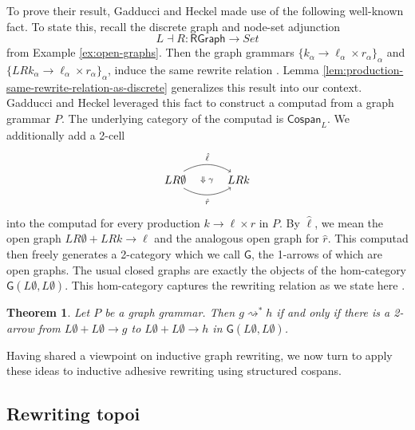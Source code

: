 \documentclass{amsart}
\newcommand{\RGraph}{\cat{RGraph}}
\newcommand{\Csp}{\cat{Cospan}}
\newcommand{\cat}[1]{\mathsf{#1}}
\newcommand{\from}{\colon}
\newcommand{\deriv}[2]{#1 \rightsquigarrow^\ast #2}
\newcommand{\csp}[3]{#1 + #3 \to #2}
\newtheorem{theorem}{Theorem}[section]
\theoremstyle{remark}
\theoremstyle{definition}
\begin{document}
To prove their result, Gadducci and Heckel made use of the following
well-known fact. To state this, recall the discrete graph and node-set
adjunction
%
\[
  L \dashv R \from \RGraph \to Set
\]
% 
from Example \ref{ex:open-graphs}. Then the graph grammars
%
$ \{ k_\alpha \to \ell_\alpha \times r_\alpha \}_\alpha $
%
and
%
$ \{ LR k_\alpha  \to \ell_\alpha \times
r_\alpha \}_\alpha $,
% 
induce the same rewrite relation
\cite[Prop.~3.3]{Ehrig_GraphGram}. Lemma
\ref{lem:production-same-rewrite-relation-as-discrete} generalizes
this result into our context.  Gadducci and Heckel leveraged this fact
to construct a computad from a graph grammar $ P $. The underlying
category of the computad is $ \Csp_L $. We additionally add a 2-cell
%
\[
  \begin{tikzpicture}
    \node (1) at (0,0) {$ LR \emptyset $};
    \node (2) at (2,0) {$ LR k $};
    \node (3) at (1,0) {\scriptsize{$ \Downarrow \gamma $}};
    \draw [->, bend left] (1.45) to node [above] {\scriptsize{$ \hat{\ell} $}} (2.135);
    \draw [->, bend right] (1.-45) to node [below] {\scriptsize{$ \hat{r} $}} (2.-135);
  \end{tikzpicture}
\]
% 
into the computad for every production $ k \to \ell \times r $ in $ P
$. By $ \hat{\ell} $, we mean the open graph
%
\(
  \csp{LR \emptyset}{\ell}{LRk}
\)
% 
and the analogous open graph for $ \hat{r} $.  This computad
then freely generates a 2-category which we call $ \cat{G} $, the
1-arrows of which are open graphs. The usual closed graphs are exactly
the objects of the hom-category
$ \cat{G}( L \emptyset , L \emptyset ) $. This hom-category captures
the rewriting relation as we state here \cite[Thm.~23]{Gadd_IndGraphTrans}.

\begin{theorem}
  Let $ P $ be a graph grammar. Then $ \deriv{g}{h} $ if and only
  if there is a 2-arrow from
  \(
    \csp{L \emptyset}{g}{L \emptyset}
  \)
  to
  \(
    \csp{L \emptyset}{h}{L \emptyset}
  \)
  in $ \cat{G} ( L \emptyset , L \emptyset ) $.  
\end{theorem}

Having shared a viewpoint on inductive graph rewriting, we now turn
to apply these ideas to inductive adhesive rewriting using structured cospans.


\subsection{Rewriting topoi}
\label{sec:Adhesive-Rewriting}
\end{document}

